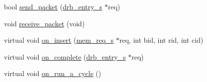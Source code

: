 \begin{DoxyCompactItemize}
\item 
bool \hyperlink{classdram__controller__c_afc34a8f4247b6197ee16f33383366303}{send\_\-packet} (\hyperlink{structdrb__entry__s}{drb\_\-entry\_\-s} $\ast$req)
\item 
void \hyperlink{classdram__controller__c_af4ab757ab961800b38c1a5602419c59f}{receive\_\-packet} (void)
\item 
virtual void \hyperlink{classdram__controller__c_a817c599eb63d1545e3351003fdf6da76}{on\_\-insert} (\hyperlink{structmem__req__s}{mem\_\-req\_\-s} $\ast$req, int bid, int rid, int cid)
\item 
virtual void \hyperlink{classdram__controller__c_ab9a5c51da823023ca5f0a3dbb68a8856}{on\_\-complete} (\hyperlink{structdrb__entry__s}{drb\_\-entry\_\-s} $\ast$req)
\item 
virtual void \hyperlink{classdram__controller__c_a27a7f5cb6b2a8666f4444816c0c86ba1}{on\_\-run\_\-a\_\-cycle} ()
\end{DoxyCompactItemize}
